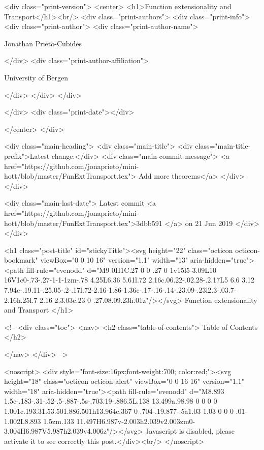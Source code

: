   <div class="print-version">
    <center>
      <h1>Function extensionality and Transport</h1><br/>
        <div class="print-authors">
          <div class="print-info">
            <div class="print-author">
              <div class="print-author-name">
                
                  Jonathan Prieto-Cubides
                
              </div>
              <div class="print-author-affiliation">
                
                  University of Bergen
                
                </div>
            </div>
          </div>
          
          
        </div>
        <div class="print-date"></div>
        
        
    </center>
  </div>

  
  <div class="main-heading">
    <div class="main-title">
      <div class="main-title-prefix">Latest change:</div>
      <div class="main-commit-message">
            <a href="https://github.com/jonaprieto/mini-hott/blob/master/FunExtTransport.tex">
              Add more theorems</a>
      </div>
    </div>

    <div class="main-last-date">
      Latest commit <a href="https://github.com/jonaprieto/mini-hott/blob/master/FunExtTransport.tex">3dbb591 </a> on  21 Jun 2019
    </div>
  </div>
  
  <h1 class="post-title" id="stickyTitle"><svg height="22" class="octicon octicon-bookmark" viewBox="0 0 10 16" version="1.1" width="13" aria-hidden="true"><path fill-rule="evenodd" d="M9 0H1C.27 0 0 .27 0 1v15l5-3.09L10 16V1c0-.73-.27-1-1-1zm-.78 4.25L6.36 5.61l.72 2.16c.06.22-.02.28-.2.17L5 6.6 3.12 7.94c-.19.11-.25.05-.2-.17l.72-2.16-1.86-1.36c-.17-.16-.14-.23.09-.23l2.3-.03.7-2.16h.25l.7 2.16 2.3.03c.23 0 .27.08.09.23h.01z"/></svg> Function extensionality and Transport
  </h1>

  <!-- 
  <div class="toc">
    <nav>
    <h2 class="table-of-contents"> Table of Contents </h2>
      

    </nav>
  </div>
   -->

  <noscript>
  <div style="font-size:16px;font-weight:700; color:red;"><svg height="18" class="octicon octicon-alert" viewBox="0 0 16 16" version="1.1" width="18" aria-hidden="true"><path fill-rule="evenodd" d="M8.893 1.5c-.183-.31-.52-.5-.887-.5s-.703.19-.886.5L.138 13.499a.98.98 0 0 0 0 1.001c.193.31.53.501.886.501h13.964c.367 0 .704-.19.877-.5a1.03 1.03 0 0 0 .01-1.002L8.893 1.5zm.133 11.497H6.987v-2.003h2.039v2.003zm0-3.004H6.987V5.987h2.039v4.006z"/></svg> Javascript is disabled, please activate it to see correctly this post.</div><br/>
  </noscript>

